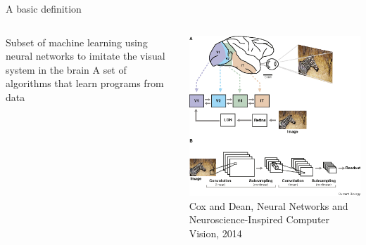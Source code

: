 \begin{frame}{A basic definition}
   \begin{columns}
      \centering
      \begin{column}{0.4\linewidth}
         \begin{baseitemize}
            \itemR Subset of machine learning using neural networks to imitate the visual system in the brain
            \vspace{0.45in}
            \itemR A set of algorithms that learn programs from data
         \end{baseitemize}
      \end{column}
      \begin{column}{0.6\linewidth}
         \centering
            \includegraphics[width=0.8\columnwidth]{images/visual-nn.png}\\
            \tiny{Cox and Dean, Neural Networks and Neuroscience-Inspired Computer Vision, 2014}
      \end{column}
   \end{columns}
\end{frame}


